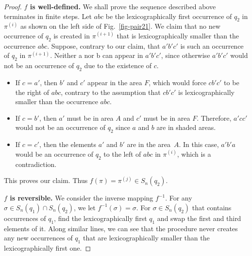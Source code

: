 \documentclass[10pt,a4paper]{amsart}
\begin{document}
\begin{proof}
\textbf{$f$ is well-defined.} 
We shall prove the sequence described above terminates in finite steps.
Let $abc$ be the lexicographically first occurrence of $q_2$ in $\pi^{(i)}$ as shown on the left side of Fig.~\ref{fig-pair21}.
We claim that no new occurrence of $q_2$ is created in $\pi^{(i+1)}$ that is lexicographically smaller than the occurrence $abc$.
Suppose, contrary to our claim, that  $a'b'c'$ is such an occurrence of $q_2$ in $\pi^{(i+1)}$. Neither a nor b can appear in $a'b'c'$, since otherwise $a'b'c'$ would not be an occurrence of $q_2$ due to the existence of $c$. 
\begin{itemize}
    \item If $c=a'$, then $b'$ and $c'$  appear in the  area $F$, which would force $cb'c'$ to be the right of $abc$, contrary to the assumption that $cb'c'$ is lexicographically smaller than the occurrence $abc$.
    \item  If $c=b'$, then $a'$ must be in area $A$ and $c'$ must be in area $F$. Therefore, $a'cc'$ would not be an occurrence of $q_2$ since $a$ and $b$ are in shaded areas.
    \item  If $c = c'$, then the elements $a'$ and $b'$ are in the area~$A$.
In this case, $a'b'a$ would be an occurrence of $q_2$ to the left of $abc$ in $\pi^{(i)}$, which is a contradiction.
\end{itemize}
This proves our claim. Thus $f(\pi)=\pi^{(j)} \in S_n(q_2)$. 

\textbf{$f$ is reversible.} We consider the inverse mapping $f^{-1}$. For any $\sigma \in S_n(q_1) \cap S_n(q_2)$, we let $f^{-1}(\sigma)=\sigma$. For $\sigma\in S_n(q_2)$ that contains occurrences of $q_1$, find the lexicographically first $q_1$ and swap the first and third elements of it. Along similar lines, we can see that the procedure never creates any new occurrences of $q_1$ that are lexicographically smaller than the lexicographically first one. 
\end{proof}
\end{document}
